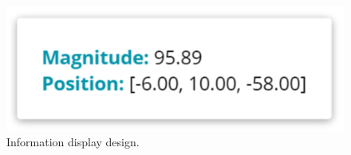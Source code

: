
\begin{figure}[H]
	\centering
	\includegraphics[scale=2]{images/design/mockups/information_display}
	\caption[Information display design]{Information display design.}
	\label{fig:information_display_design}
\end{figure}
